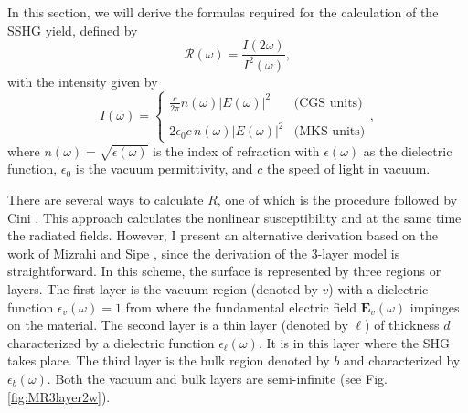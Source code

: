 In this section, we will derive the formulas required for the calculation of the
SSHG yield, defined by
\begin{equation}\label{eq:rintensities}
\mathcal{R}(\omega)=\frac{I(2\omega)}{I^2(\omega)},
\end{equation}
with the intensity given by \cite{boyd, sutherland}
\begin{equation}\label{eq:intensity}
I(\omega)=
\left\{
\begin{array}{cc}
\frac{c}{2\pi}n(\omega)|E(\omega)|^{2} & \text{(CGS units)} \\\\
2\epsilon_{0}c\, n(\omega)|E(\omega)|^{2} & \text{(MKS units)}
\end{array}
\right.,
\end{equation}
where $n(\omega)=\sqrt{\epsilon(\omega)}$ is the index of refraction with
$\epsilon(\omega)$ as the dielectric function, $\epsilon_{0}$ is the vacuum
permittivity, and $c$ the speed of light in vacuum.

There are several ways to calculate $R$, one of which is the procedure followed
by Cini \cite{ciniPRB91}. This approach calculates the nonlinear susceptibility
and at the same time the radiated fields. However, I present an alternative
derivation based on the work of Mizrahi and Sipe \cite{mizrahiJOSA88}, since the
derivation of the 3-layer model is straightforward. In this scheme, the surface
is represented by three regions or layers. The first layer is the vacuum region
(denoted by $v$) with a dielectric function $\epsilon_{v}(\omega)=1$ from where
the fundamental electric field $\mathbf{E}_{v}(\omega)$ impinges on the
material. The second layer is a thin layer (denoted by $\ell$) of thickness $d$
characterized by a dielectric function $\epsilon_{\ell}(\omega)$. It is in this
layer where the SHG takes place. The third layer is the bulk region denoted by
$b$ and characterized by $\epsilon_{b}(\omega)$. Both the vacuum and bulk layers
are semi-infinite (see Fig. \ref{fig:MR3layer2w}).

